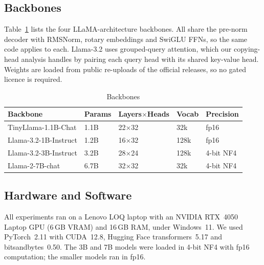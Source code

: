 \documentclass[conference]{IEEEtran}
\begin{document}
\subsection{Backbones}
Table~\ref{tab:backbones} lists the four LLaMA-architecture backbones. All share the pre-norm decoder with RMSNorm, rotary embeddings and SwiGLU FFNs, so the same code applies to each. Llama-3.2 uses grouped-query attention, which our copying-head analysis handles by pairing each query head with its shared key-value head. Weights are loaded from public re-uploads of the official releases, so no gated licence is required.

\begin{table}[t]
\caption{Backbones}
\label{tab:backbones}
\centering\footnotesize
\setlength{\tabcolsep}{4pt}
\begin{tabular}{@{}lllll@{}}
\toprule
Backbone & Params & Layers$\times$Heads & Vocab & Precision \\
\midrule
TinyLlama-1.1B-Chat & 1.1B & 22$\times$32 & 32k & fp16 \\
Llama-3.2-1B-Instruct & 1.2B & 16$\times$32 & 128k & fp16 \\
Llama-3.2-3B-Instruct & 3.2B & 28$\times$24 & 128k & 4-bit NF4 \\
Llama-2-7B-chat & 6.7B & 32$\times$32 & 32k & 4-bit NF4 \\
\bottomrule
\end{tabular}
\end{table}

\subsection{Hardware and Software}
All experiments ran on a Lenovo LOQ laptop with an NVIDIA RTX~4050 Laptop GPU (6\,GB VRAM) and 16\,GB RAM, under Windows~11. We used PyTorch~2.11 with CUDA~12.8, Hugging Face transformers~5.17 and bitsandbytes~0.50. The 3B and 7B models were loaded in 4-bit NF4 with fp16 computation; the smaller models ran in fp16.
\end{document}
